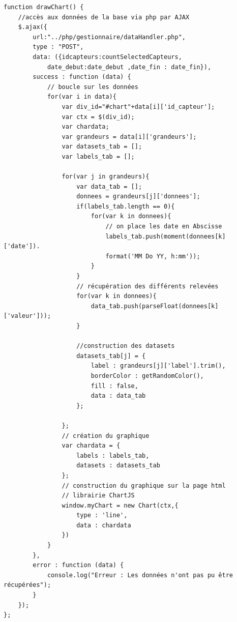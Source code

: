 \begin{verbatim}
function drawChart() {
    //accès aux données de la base via php par AJAX
    $.ajax({
        url:"../php/gestionnaire/dataHandler.php",
        type : "POST",
        data: ({idcapteurs:countSelectedCapteurs,
            date_debut:date_debut ,date_fin : date_fin}),
        success : function (data) {
            // boucle sur les données
            for(var i in data){
                var div_id="#chart"+data[i]['id_capteur'];
                var ctx = $(div_id);
                var chardata;
                var grandeurs = data[i]['grandeurs'];
                var datasets_tab = [];
                var labels_tab = [];

                for(var j in grandeurs){
                    var data_tab = [];
                    donnees = grandeurs[j]['donnees'];
                    if(labels_tab.length == 0){
                        for(var k in donnees){
                            // on place les date en Abscisse
                            labels_tab.push(moment(donnees[k]['date']).
                            format('MM Do YY, h:mm'));
                        }
                    }
                    // récupération des différents relevées
                    for(var k in donnees){
                        data_tab.push(parseFloat(donnees[k]['valeur']));
                    }

                    //construction des datasets
                    datasets_tab[j] = {
                        label : grandeurs[j]['label'].trim(),
                        borderColor : getRandomColor(),
                        fill : false,
                        data : data_tab
                    };

                };
                // création du graphique
                var chardata = {
                    labels : labels_tab,
                    datasets : datasets_tab
                };
                // construction du graphique sur la page html
                // librairie ChartJS
                window.myChart = new Chart(ctx,{
                    type : 'line',
                    data : chardata
                })
            }
        },
        error : function (data) {
            console.log("Erreur : Les données n'ont pas pu être récupérées");
        }
    });
};
\end{verbatim}
